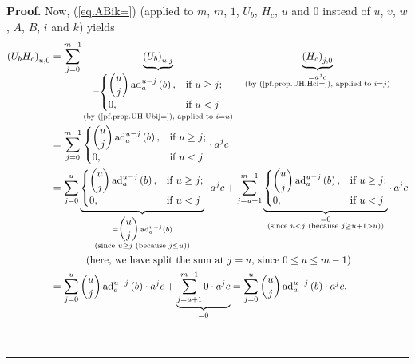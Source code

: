 \documentclass[numbers=enddot,12pt,final,onecolumn,notitlepage]{scrartcl}%
\theoremstyle{definition}
\newenvironment{proof}[1][Proof]{\noindent\textbf{#1.} }{\ \rule{0.5em}{0.5em}}
\let\sumnonlimits\sum
\renewcommand{\sum}{\sumnonlimits\limits}
\begin{document}
\begin{proof}
Now, (\ref{eq.ABik=}) (applied to $m$, $m$, $1$, $U_{b}$, $H_{c}$, $u$ and $0$
instead of $u$, $v$, $w$, $A$, $B$, $i$ and $k$) yields%
\begin{align*}
\left(  U_{b}H_{c}\right)  _{u,0}  &  =\sum_{j=0}^{m-1}\underbrace{\left(
U_{b}\right)  _{u,j}}_{\substack{=%
\begin{cases}
\dbinom{u}{j}\operatorname*{ad}\nolimits_{a}^{u-j}\left(  b\right)  , &
\text{if }u\geq j;\\
0, & \text{if }u<j
\end{cases}
\\\text{(by (\ref{pf.prop.UH.Ubij=}), applied to }i=u\text{)}}%
}\ \ \ \underbrace{\left(  H_{c}\right)  _{j,0}}_{\substack{=a^{j}c\\\text{(by
(\ref{pf.prop.UH.Hci=}), applied to }i=j\text{)}}}\\
&  =\sum_{j=0}^{m-1}%
\begin{cases}
\dbinom{u}{j}\operatorname*{ad}\nolimits_{a}^{u-j}\left(  b\right)  , &
\text{if }u\geq j;\\
0, & \text{if }u<j
\end{cases}
\cdot a^{j}c\\
&  =\sum_{j=0}^{u}\underbrace{%
\begin{cases}
\dbinom{u}{j}\operatorname*{ad}\nolimits_{a}^{u-j}\left(  b\right)  , &
\text{if }u\geq j;\\
0, & \text{if }u<j
\end{cases}
}_{\substack{=\dbinom{u}{j}\operatorname*{ad}\nolimits_{a}^{u-j}\left(
b\right)  \\\text{(since }u\geq j\text{ (because }j\leq u\text{))}}%
}\cdot\,a^{j}c+\sum_{j=u+1}^{m-1}\underbrace{%
\begin{cases}
\dbinom{u}{j}\operatorname*{ad}\nolimits_{a}^{u-j}\left(  b\right)  , &
\text{if }u\geq j;\\
0, & \text{if }u<j
\end{cases}
}_{\substack{=0\\\text{(since }u<j\text{ (because }j\geq u+1>u\text{))}}%
}\cdot\,a^{j}c\\
&  \ \ \ \ \ \ \ \ \ \ \left(  \text{here, we have split the sum at
}j=u\text{, since }0\leq u\leq m-1\right) \\
&  =\sum_{j=0}^{u}\dbinom{u}{j}\operatorname*{ad}\nolimits_{a}^{u-j}\left(
b\right)  \cdot a^{j}c+\underbrace{\sum_{j=u+1}^{m-1}0\cdot a^{j}c}_{=0}%
=\sum_{j=0}^{u}\dbinom{u}{j}\operatorname*{ad}\nolimits_{a}^{u-j}\left(
b\right)  \cdot a^{j}c.
\end{align*}

\end{proof}
\end{document}
